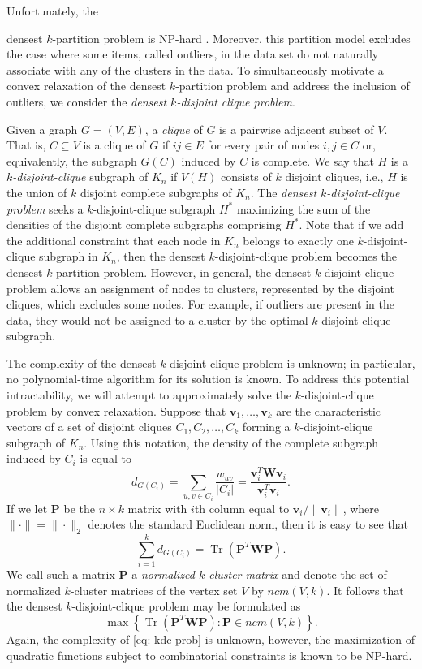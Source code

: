 \documentclass[twoside,11pt]{article}
\DeclareMathOperator{\tr}{{Tr}}
\renewcommand{\P}{\bs{P}}
\newcommand{\bs}{\boldsymbol}
\renewcommand{\v}{\bs{v}}
\newcommand{\W}{\bs {W}}
\newcommand{\0}{\bs{0}}
\newcommand{\bra}[1]{\ensuremath{\left\{ #1 \right\}}} %
\newcommand{\kdc}{\(k\)-disjoint-clique }
\begin{document}
Unfortunately, the {densest \(k\)-partition problem is NP-hard \citep[see][]{peng2007approximating}. Moreover, this partition model excludes the
	case where some items, called outliers, in the data set do not naturally associate
	with any of the clusters in the data.
	To simultaneously motivate a convex relaxation of the densest \(k\)-partition
	problem and address the inclusion of outliers, we consider the \emph{densest
		\(k\)-disjoint clique problem}.

	Given a graph \(G=(V,E)\), a \emph{clique} of \(G\) is a pairwise
	adjacent subset of \(V\). That is, \(C \subseteq V\)
	is a clique of \(G\) if \(ij\in E\) for every pair of nodes \(i,j \in C\)
	or, equivalently, the subgraph \(G(C)\) induced by \(C\) is
	{complete}.
	We say that \(H\) is a \emph{\(k\)-disjoint-clique} subgraph of \(K_n\)
	if \(V(H)\) consists of \(k\) disjoint cliques, i.e., \(H\) is the union
	of \(k\) disjoint complete subgraphs of \(K_n\).
	The \emph{densest \(k\)-disjoint-clique problem} seeks a \(k\)-disjoint-clique
	subgraph \(H^*\) maximizing the sum of the densities of the disjoint
	complete subgraphs comprising \(H^*\).
	Note that if we add the additional constraint that each node in \(K_n\) belongs
	to exactly one \kdc subgraph in \(K_n\), then
	the densest \kdc problem becomes the densest \(k\)-partition problem.
	However, in general, the densest \kdc problem allows an assignment of nodes
	to clusters, represented by the disjoint cliques, which excludes
	some nodes. For example, if outliers are present in the data, they would not be assigned to a
	cluster by the optimal \kdc subgraph.

	The complexity of the densest \kdc problem is unknown;
	in particular, no polynomial-time algorithm for its solution is known.
	To address this potential intractability, we will attempt to approximately solve the \kdc problem by convex
	relaxation.
	Suppose that \( \v_1, \dots, \v_k \) are the characteristic vectors
	of a set of disjoint cliques \(C_1, C_2, \dots, C_k\)
	forming a \kdc subgraph of \(K_n\).
	Using this notation, the density of the complete subgraph induced
	by \(C_i\) is equal to
	\[
	d_{G(C_i)} = \sum_{u, v \in C_{i}} \frac{w_{uv}}{|C_i|}
	= \frac{\v_i^T \W \v_i}{\v_i^T \v_i}.
	\]
	If we let \(\P\) be the \(n \times k\) matrix with \(i\)th column equal to \(\v_i/ \|\v_i\|\), where \(\|\cdot\| = \|\cdot\|_2\)
	denotes the standard Euclidean norm, then
	it is easy to see that
	\[
	\sum_{i=1}^k d_{G(C_i)} = \tr(\P^T \W \P).
	\]
	We call such a matrix \(\P\) a \emph{normalized \(k\)-cluster matrix} and denote the set of normalized \(k\)-cluster
	matrices of the vertex set \(V\) by \(ncm(V,k)\).
	It follows that the densest \kdc problem may be formulated as
	\begin{equation} \label{eq: kdc prob}
	\max \bra{ \tr(\P^T \W \P) : \P \in ncm(V,k) }.
	\end{equation}
	Again, the complexity of \eqref{eq: kdc prob} is unknown, however, the maximization of quadratic functions
	subject to combinatorial constraints is known to be NP-hard.

}
\end{document}
